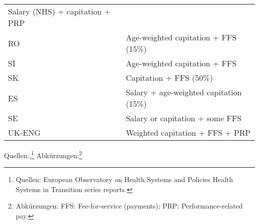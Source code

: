 \documentclass[ngerman,a4paper]{article}
\let\rmarkdownfootnote\footnote%
\def\footnote{\protect\rmarkdownfootnote}
\begin{document}
\begin{longtable}[c]{@{}ll@{}}
\begin{minipage}[t]{0.86\columnwidth}\raggedright\strut
Salary (NHS) + capitation + PRP
\strut\end{minipage}\tabularnewline
\begin{minipage}[t]{0.08\columnwidth}\raggedright\strut
RO
\strut\end{minipage} &
\begin{minipage}[t]{0.86\columnwidth}\raggedright\strut
Age-weighted capitation + FFS (15\%)
\strut\end{minipage}\tabularnewline
\begin{minipage}[t]{0.08\columnwidth}\raggedright\strut
SI
\strut\end{minipage} &
\begin{minipage}[t]{0.86\columnwidth}\raggedright\strut
Age-weighted capitation + FFS
\strut\end{minipage}\tabularnewline
\begin{minipage}[t]{0.08\columnwidth}\raggedright\strut
SK
\strut\end{minipage} &
\begin{minipage}[t]{0.86\columnwidth}\raggedright\strut
Capitation + FFS (50\%)
\strut\end{minipage}\tabularnewline
\begin{minipage}[t]{0.08\columnwidth}\raggedright\strut
ES
\strut\end{minipage} &
\begin{minipage}[t]{0.86\columnwidth}\raggedright\strut
Salary + age-weighted capitation (15\%)
\strut\end{minipage}\tabularnewline
\begin{minipage}[t]{0.08\columnwidth}\raggedright\strut
SE
\strut\end{minipage} &
\begin{minipage}[t]{0.86\columnwidth}\raggedright\strut
Salary or capitation + some FFS
\strut\end{minipage}\tabularnewline
\begin{minipage}[t]{0.08\columnwidth}\raggedright\strut
UK-ENG
\strut\end{minipage} &
\begin{minipage}[t]{0.86\columnwidth}\raggedright\strut
Weighted capitation + FFS + PRP
\strut\end{minipage}\tabularnewline
\bottomrule
\end{longtable}

Quellen:,\footnote{Quellen: European Observatory on Health Systems and
  Policies Health Systems in Transition series reports.}
Abkürzungen:\footnote{Abkürzungen: FFS: Fee-for-service (payments); PRP:
  Performance-related pay.}
\end{document}

